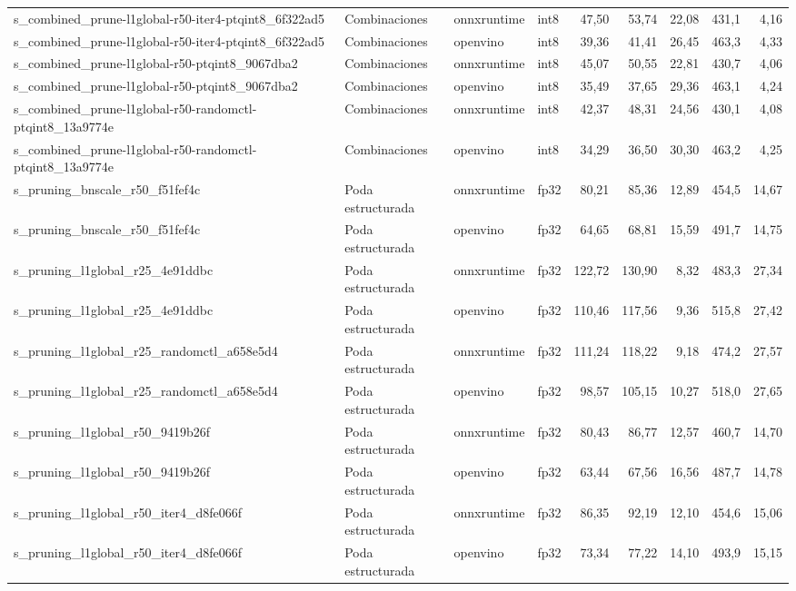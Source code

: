 \begin{landscape}
\begin{table}[htbp]
\begin{adjustbox}{max width=\linewidth, max totalheight=\dimexpr\textheight-\ht\tfmedgetitle-\dp\tfmedgetitle-\ht\tfmedgenotes-\dp\tfmedgenotes-6pt\relax}
\begin{tabular}{llllrrrrr}
    s\_combined\_prune-l1global-r50-iter4-ptqint8\_6f322ad5 & Combinaciones & onnxruntime & int8 & 47,50 & 53,74 & 22,08 & 431,1 & 4,16 \\
    s\_combined\_prune-l1global-r50-iter4-ptqint8\_6f322ad5 & Combinaciones & openvino & int8 & 39,36 & 41,41 & 26,45 & 463,3 & 4,33 \\
    s\_combined\_prune-l1global-r50-ptqint8\_9067dba2 & Combinaciones & onnxruntime & int8 & 45,07 & 50,55 & 22,81 & 430,7 & 4,06 \\
    s\_combined\_prune-l1global-r50-ptqint8\_9067dba2 & Combinaciones & openvino & int8 & 35,49 & 37,65 & 29,36 & 463,1 & 4,24 \\
    s\_combined\_prune-l1global-r50-randomctl-ptqint8\_13a9774e & Combinaciones & onnxruntime & int8 & 42,37 & 48,31 & 24,56 & 430,1 & 4,08 \\
    s\_combined\_prune-l1global-r50-randomctl-ptqint8\_13a9774e & Combinaciones & openvino & int8 & 34,29 & 36,50 & 30,30 & 463,2 & 4,25 \\
    s\_pruning\_bnscale\_r50\_f51fef4c & Poda estructurada & onnxruntime & fp32 & 80,21 & 85,36 & 12,89 & 454,5 & 14,67 \\
    s\_pruning\_bnscale\_r50\_f51fef4c & Poda estructurada & openvino & fp32 & 64,65 & 68,81 & 15,59 & 491,7 & 14,75 \\
    s\_pruning\_l1global\_r25\_4e91ddbc & Poda estructurada & onnxruntime & fp32 & 122,72 & 130,90 & 8,32 & 483,3 & 27,34 \\
    s\_pruning\_l1global\_r25\_4e91ddbc & Poda estructurada & openvino & fp32 & 110,46 & 117,56 & 9,36 & 515,8 & 27,42 \\
    s\_pruning\_l1global\_r25\_randomctl\_a658e5d4 & Poda estructurada & onnxruntime & fp32 & 111,24 & 118,22 & 9,18 & 474,2 & 27,57 \\
    s\_pruning\_l1global\_r25\_randomctl\_a658e5d4 & Poda estructurada & openvino & fp32 & 98,57 & 105,15 & 10,27 & 518,0 & 27,65 \\
    s\_pruning\_l1global\_r50\_9419b26f & Poda estructurada & onnxruntime & fp32 & 80,43 & 86,77 & 12,57 & 460,7 & 14,70 \\
    s\_pruning\_l1global\_r50\_9419b26f & Poda estructurada & openvino & fp32 & 63,44 & 67,56 & 16,56 & 487,7 & 14,78 \\
    s\_pruning\_l1global\_r50\_iter4\_d8fe066f & Poda estructurada & onnxruntime & fp32 & 86,35 & 92,19 & 12,10 & 454,6 & 15,06 \\
    s\_pruning\_l1global\_r50\_iter4\_d8fe066f & Poda estructurada & openvino & fp32 & 73,34 & 77,22 & 14,10 & 493,9 & 15,15 \\

\end{tabular}
\end{adjustbox}
\end{table}
\end{landscape}
